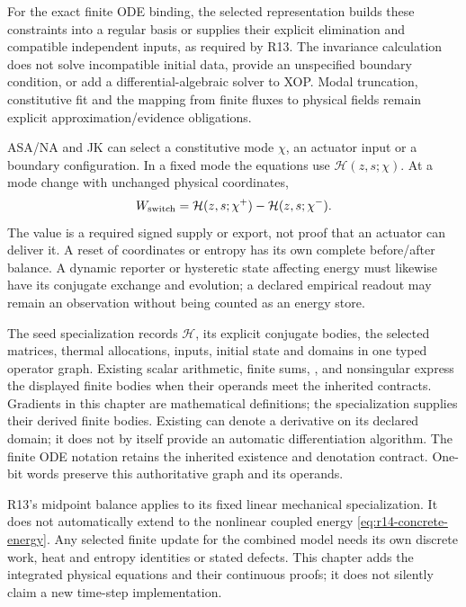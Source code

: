 For the exact finite ODE binding, the selected representation builds these
constraints into a regular basis or supplies their explicit elimination and
compatible independent inputs, as required by R13. The invariance calculation
does not solve incompatible initial data, provide an unspecified boundary
condition, or add a differential-algebraic solver to XOP. Modal truncation,
constitutive fit and the mapping from finite fluxes to physical fields remain
explicit approximation/evidence obligations.

ASA/NA and JK can select a constitutive mode $\chi$, an actuator input or a
boundary configuration. In a fixed mode the equations use
$\mathcal H(z,s;\chi)$. At a mode change with unchanged physical coordinates,
\begin{equation}
 W_{\rm switch}=\mathcal H(z,s;\chi^+)-\mathcal H(z,s;\chi^-).
 \label{eq:r14-mode-energy}
\end{equation}
The value is a required signed supply or export, not proof that an actuator
can deliver it. A reset of coordinates or entropy has its own complete
before/after balance. A dynamic reporter or hysteretic state affecting energy
must likewise have its conjugate exchange and evolution; a declared empirical
readout may remain an observation without being counted as an energy store.

The seed specialization records $\mathcal H$, its explicit conjugate bodies,
the selected matrices, thermal allocations, inputs, initial state and domains
in one typed operator graph. Existing scalar arithmetic, finite sums,
, and nonsingular  express the displayed finite
bodies when their operands meet the inherited contracts. Gradients in this
chapter are mathematical definitions; the specialization supplies their
derived finite bodies. Existing  can denote a derivative on its
declared domain; it does not by itself provide an automatic differentiation
algorithm. The finite ODE notation retains the inherited existence and denotation
contract. One-bit words preserve this authoritative graph and its operands.

R13's midpoint balance applies to its fixed linear mechanical specialization.
It does not automatically extend to the nonlinear coupled energy
\eqref{eq:r14-concrete-energy}. Any selected finite update for the combined
model needs its own discrete work, heat and entropy identities or stated
defects. This chapter adds the integrated physical equations and their
continuous proofs; it does not silently claim a new time-step implementation.
